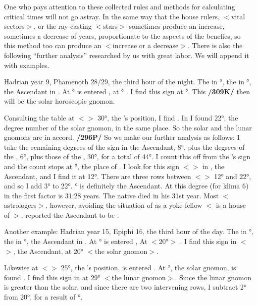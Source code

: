 One who pays attention to these collected rules and methods for calculating critical times will not go astray. In the same way that the house rulers, $<$vital sectors$>$, or the ray-casting $<$stars$>$ sometimes produce an increase, sometimes a decrease of years, proportionate to the aspects of the benefics, so this method too
can produce an $<$increase or a decrease$>$. There is also the following “further analysis” researched by us with great labor. We will append it with examples.

Hadrian year 9, Phamenoth 28/29, the third hour of the night. The \Sun\xspace in \Aries\xspace 6°, the \Moon\xspace in \Aries\xspace
30°, the Ascendant in \Scorpio. At \Aries\xspace 6° is entered \Sagittarius, at \Sagittarius\xspace 6° \Cancer. I find this sign at \Scorpio\xspace 22°. This \textbf{/309K/} then will be the solar horoscopic gnomon. 

Consulting the table at $<$\Aries$>$ 30°, the \Moon’s position, I find \Scorpio. In \Scorpio\xspace I found 22°, the degree number of the solar gnomon, in the same place. So the solar and the lunar gnomons are in accord. \textbf{/296P/} So we make our further analysis as follows: I take the remaining degrees of the sign in the Ascendant, 8°, plus the degrees of the \Sun, 6°, plus those of the \Moon, 30°, for a total of 44°. I count this off from the \Moon’s sign and the count
stops at \Taurus\xspace 14°, the place of \Gemini. I look for this sign $<$\Gemini$>$ in \Scorpio, the Ascendant, and I find it at 12°. There are three rows between $<$\Scorpio$>$ 12° and 22°, and so I add 3° to 22°. \Scorpio\xspace 25° is definitely the Ascendant. At this degree (for klima 6) in the first factor is 31;28 years. The native died
in his 31st year. Most $<$astrologers$>$, however, avoiding the situation of \Mars\xspace as a yoke-fellow $<$\Scorpio\xspace is a house of \Mars$>$, reported the Ascendant to be \Libra.

Another example: Hadrian year 15, Epiphi 16, the third hour of the day. The \Sun\xspace in °, the \Moon\xspace in \Gemini\xspace 25°, the Ascendant in \Virgo. At \Cancer\xspace 20° is entered \Virgo, At \Virgo $<$20°$>$ \Cancer. I find this sign in $<$\Virgo$>$, the Ascendant, at 20° $<$the solar gnomon$>$.

Likewise at $<$\Gemini$>$ 25°, the \Moon’s position, is entered \Aquarius. At \Aquarius\xspace 20°, the solar gnomon, is found \Aries. I find this sign in \Virgo\xspace at 29° $<$the lunar gnomon$>$. Since the lunar gnomon is greater than the solar, and since there are two intervening rows, I subtract 2° from 20°, for a result of \Virgo\xspace 18°. 


